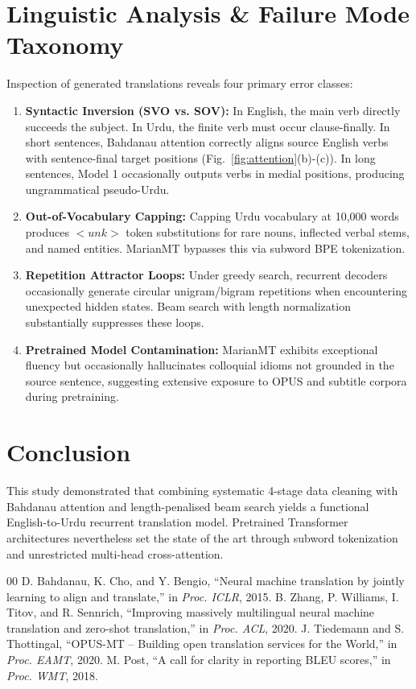 \documentclass[conference]{IEEEtran}
\begin{document}
\section{Linguistic Analysis \& Failure Mode Taxonomy}
Inspection of generated translations reveals four primary error classes:
\begin{enumerate}
    \item \textbf{Syntactic Inversion (SVO vs. SOV):} In English, the main verb directly succeeds the subject. In Urdu, the finite verb must occur clause-finally. In short sentences, Bahdanau attention correctly aligns source English verbs with sentence-final target positions (Fig.~\ref{fig:attention}(b)-(c)). In long sentences, Model 1 occasionally outputs verbs in medial positions, producing ungrammatical pseudo-Urdu.
    \item \textbf{Out-of-Vocabulary Capping:} Capping Urdu vocabulary at 10,000 words produces $<unk>$ token substitutions for rare nouns, inflected verbal stems, and named entities. MarianMT bypasses this via subword BPE tokenization.
    \item \textbf{Repetition Attractor Loops:} Under greedy search, recurrent decoders occasionally generate circular unigram/bigram repetitions when encountering unexpected hidden states. Beam search with length normalization substantially suppresses these loops.
    \item \textbf{Pretrained Model Contamination:} MarianMT exhibits exceptional fluency but occasionally hallucinates colloquial idioms not grounded in the source sentence, suggesting extensive exposure to OPUS and subtitle corpora during pretraining.
\end{enumerate}

\section{Conclusion}
This study demonstrated that combining systematic 4-stage data cleaning with Bahdanau attention and length-penalised beam search yields a functional English-to-Urdu recurrent translation model. Pretrained Transformer architectures nevertheless set the state of the art through subword tokenization and unrestricted multi-head cross-attention.

\begin{thebibliography}{00}
 D. Bahdanau, K. Cho, and Y. Bengio, ``Neural machine translation by jointly learning to align and translate,'' in \textit{Proc. ICLR}, 2015.
 B. Zhang, P. Williams, I. Titov, and R. Sennrich, ``Improving massively multilingual neural machine translation and zero-shot translation,'' in \textit{Proc. ACL}, 2020.
 J. Tiedemann and S. Thottingal, ``OPUS-MT -- Building open translation services for the World,'' in \textit{Proc. EAMT}, 2020.
 M. Post, ``A call for clarity in reporting BLEU scores,'' in \textit{Proc. WMT}, 2018.
\end{thebibliography}
\end{document}
